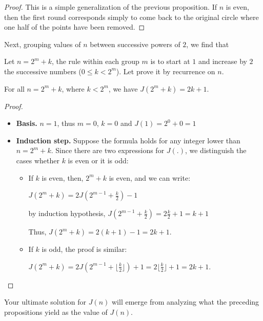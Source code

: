 \begin{itemize}

\begin{proof}
This is a simple generalization of the previous proposition.  If $n$ is even, then the first round corresponds simply to come back to the original circle where one half of the points have been removed. 
\end{proof}

Next, grouping values of $n$ between successive powers of $2$, we find that

Let $n=2^m+k$, the rule within each group $m$ is to start at $1$ and increase by $2$ the successive numbers
($0 \leq k < 2^m$).
Let prove it by recurrence on $n$.
\medskip

\begin{prop}
For all $n = 2^m+k$, where $k < 2^m$, we have
$J(2^m+k) = 2k+1$.
\end{prop}

\begin{proof}
\begin{itemize}
\item {\bf Basis.} 
$n=1$, thus $m=0$, $k=0$ and $J(1) = 2^0+0 = 1$
\medskip\item {\bf Induction step.} 
Suppose the formula holds for any integer lower than $n=2^m+k$. 
Since there are two expressions for $J(.)$, we distinguish the cases whether $k$ is even or it is odd:
\begin{itemize}
\item If $k$ is even, then, $2^m+k$ is even, and we can write:

$J(2^m+k) = 2J(2^{m-1}+\frac{k}{2})-1$

by induction hypothesis, $J(2^{m-1} +\frac{k}{2}) = 2\frac{k}{2} +1 = k+1$

Thus, $J(2^m+k) = 2(k+1) -1 = 2k+1$.

\medskip\item If $k$ is odd, the proof is similar:

$J(2^m+k) = 2J(2^{m-1}+\lfloor \frac{k}{2} \rfloor)+1 = 2\lfloor \frac{k}{2} \rfloor +1 = 2k+1$.

\end{itemize}
\end{itemize}
\end{proof}

\medskip

Your ultimate solution for $J(n)$ will emerge from analyzing what the preceding propositions yield as the value of $J(n)$.  


\end{itemize}
